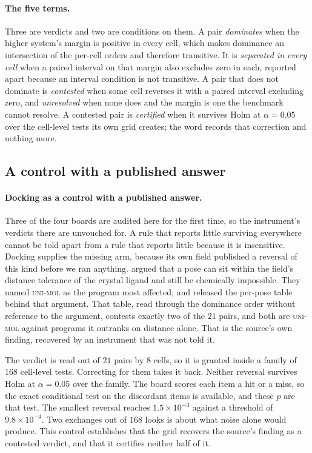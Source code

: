 \documentclass{article}
\begin{document}
\paragraph{The five terms.} Three are verdicts and two are conditions on them. A pair
\emph{dominates} when the higher system's margin is positive in every cell, which makes dominance an
intersection of the per-cell orders and therefore transitive. It is \emph{separated in every cell}
when a paired interval on that margin also excludes zero in each, reported apart because an interval
condition is not transitive. A pair that does not dominate is \emph{contested} when some cell
reverses it with a paired interval excluding zero, and \emph{unresolved} when none does and the
margin is one the benchmark cannot resolve. A contested pair is \emph{certified} when it survives
Holm at $\alpha=0.05$ over the cell-level tests its own grid creates; the word records that
correction and nothing more.

\subsection{A control with a published answer}
\label{sec:control}

\paragraph{Docking as a control with a published answer.} Three of the four boards are
audited here for the first time, so the instrument's verdicts there are unvouched for. A rule that
reports little surviving everywhere cannot be told apart from a rule that reports little because it
is insensitive. Docking supplies the missing arm, because its own field published a reversal of
this kind before we ran anything. \citet{Buttenschoen_2024} argued that a pose can sit within the
field's distance tolerance of the crystal ligand and still be chemically impossible. They named
\textsc{uni-mol} as the program most affected, and released the per-pose table behind that argument.
That table, read through the dominance order without reference to the argument, contests exactly two
of the $21$ pairs, and both are \textsc{uni-mol} against programs it outranks on distance alone.
That is the source's own finding, recovered by an instrument that was not told it.

The verdict is read out of $21$ pairs by $8$ cells, so it is granted inside a family of $168$
cell-level tests. Correcting for them takes it back. Neither reversal survives Holm at
$\alpha=0.05$ over the family. The board scores each item a hit or a miss, so the exact conditional
test on the discordant items is available, and these $p$ are that test. The smallest reversal
reaches $1.5\times10^{-3}$ against a threshold of $9.8\times10^{-4}$. Two exchanges out of $168$
looks is about what noise alone would produce. This control establishes that the grid recovers the
source's finding as a contested verdict, and that it certifies neither half of it.
\end{document}
